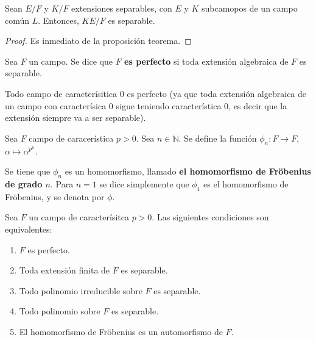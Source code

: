 \documentclass[12pt]{report}
\theoremstyle{largebreak}
\begin{document}
    \begin{cor}
        Sean $E/F$ y $K/F$ extensiones separables, con $E$ y $K$ subcamopos de un campo común $L$. Entonces, $KE/F$ es separable.
    \end{cor}

    \begin{proof}
        Es inmediato de la proposición teorema.
    \end{proof}

    \begin{mydef}
        Sea $F$ un campo. Se dice que \textbf{$F$ es perfecto} si toda extensión algebraica de $F$ es separable.
    \end{mydef}

    \begin{obs}
        Todo campo de caracterísitica $0$ es perfecto (ya que toda extensión algebraica de un campo con caracterísica $0$ sigue teniendo característica $0$, es decir que la extensión siempre va a ser separable).
    \end{obs}

    \begin{mydef}
        Sea $F$ campo de caracerística $p>0$. Sea $n\in\mathbb{N}$. Se define la función $\phi_n:F\rightarrow F$, $\alpha\mapsto\alpha^{p^n}$.

        Se tiene que $\phi_n$ es un homomorfismo, llamado \textbf{el homomorfismo de Fröbenius de grado $n$}. Para $n=1$ se dice simplemente que $\phi_1$ es el homomorfismo de Fröbenius, y se denota por $\phi$.
    \end{mydef}

    \begin{theor}
        Sea $F$ un campo de caracterísitca $p>0$. Las siguientes condiciones son equivalentes:
        \begin{enumerate}
            \item $F$ es perfecto.
            \item Toda extensión finita de $F$ es separable.
            \item Todo polinomio irreducible sobre $F$ es separable.
            \item Todo polinomio sobre $F$ es separable.
            \item El homomorfismo de Fröbenius es un automorfismo de $F$.
        \end{enumerate}
    \end{theor}
    
\end{document}
